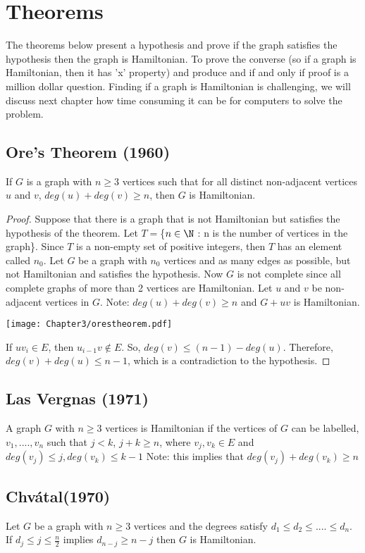  \newpage

    \section{Theorems}
  The theorems below present a hypothesis and prove if the graph satisfies the hypothesis then the graph is Hamiltonian. To prove the converse (so if a graph is Hamiltonian, then it has 'x' property) and produce and if and only if proof is a million dollar question. Finding if a graph is Hamiltonian is challenging, we will discuss next chapter how time consuming it can be for computers to solve the problem. 
    \subsection{Ore's Theorem (1960)}
  If $G$ is a graph with $n \geq 3$ vertices such that for all distinct non-adjacent vertices $u$ and $v$, $deg(u) + deg(v) \geq n$, then $G$ is Hamiltonian.
    \begin{proof}
  Suppose that there is a graph that is not Hamiltonian but satisfies the hypothesis of the theorem. Let $T = $\{$n \in \N $ : n is the number of vertices in the graph\}. Since $T$ is a non-empty set of positive integers, then $T$ has an element called $n_{0}$. Let $G$ be a graph with $n_{0}$ vertices and as many edges as possible, but not Hamiltonian and satisfies the hypothesis. Now $G$ is not complete since all complete graphs of more than 2 vertices are Hamiltonian. Let $u$ and $v$ be non-adjacent vertices in $G$. Note: $deg(u) + deg(v) \geq n$ and $G + uv$ is Hamiltonian. 
  \begin{center}
  	\texttt{[image: Chapter3/orestheorem.pdf]}
  \end{center}
    
    
    If $uv_{i} \in E$, then $u_{i-1}v \notin E$. So, $deg(v) \leq (n-1) - deg(u)$. Therefore, $deg(v) + deg(u) \leq n - 1$, which is a contradiction to the hypothesis.\cite{Ore'sTheorem}
    \end{proof}
  \subsection{Las Vergnas (1971)}
  A graph $G$ with $n \geq 3$ vertices is Hamiltonian if the vertices of $G$ can be labelled, $v_{1}, .... ,v_{n}$ such that $j < k$, $j + k \geq n$, where $v_{j}, v_{k} \in E$ and $deg(v_{j}) \leq j, deg(v_{k}) \leq k - 1$ Note: this implies that $deg(v_{j}) + deg(v_{k}) \geq n$
    \subsection{Chv\'{a}tal(1970)}
  Let $G$ be a graph with $n \geq 3$ vertices and the degrees satisfy $d_{1} \leq d_{2} \leq .... \leq d_{n}$. If $d_{j} \leq j \leq \frac{n}{2}$ implies $d_{n-j} \geq n - j$ then $G$ is Hamiltonian.
    
